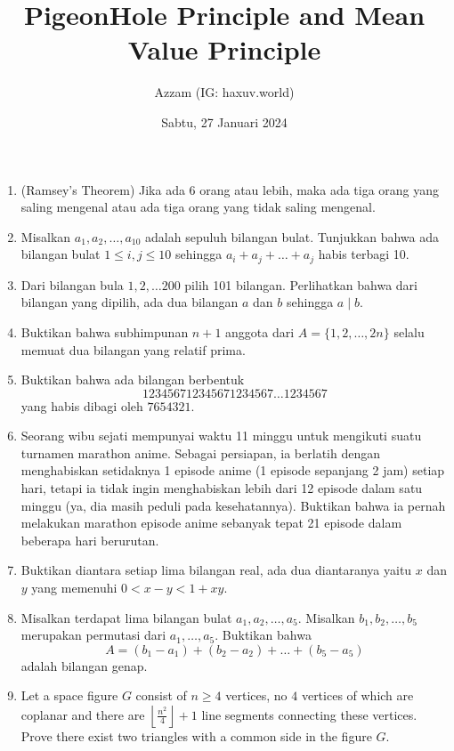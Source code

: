 \documentclass[11pt]{scrartcl}
\title{PigeonHole Principle and Mean Value Principle}
\author{Azzam (IG: haxuv.world)}
\date{Sabtu, 27 Januari 2024}
\begin{document}
\maketitle
\begin{enumerate}
    \item (Ramsey's Theorem) Jika ada 6 orang atau lebih, maka ada tiga orang yang saling mengenal atau ada tiga orang yang tidak saling mengenal.

    \item Misalkan $a_1, a_2, \dots, a_{10}$ adalah sepuluh bilangan bulat. Tunjukkan bahwa ada bilangan bulat $1 \le i,j \le 10$ sehingga $a_i+a_j+\dots+a_j$ habis terbagi 10.

    \item Dari bilangan bula $1,2,\dots 200$ pilih 101 bilangan. Perlihatkan bahwa dari bilangan yang dipilih, ada dua bilangan $a$ dan $b$ sehingga $a \mid b$.

    \item Buktikan bahwa subhimpunan $n+1$ anggota dari $A=\{1,2,\dots, 2n\}$ selalu memuat dua bilangan yang relatif prima.

    \item Buktikan bahwa ada bilangan berbentuk $$123456712345671234567\dots1234567$$
    yang habis dibagi oleh $7654321$.

    \item Seorang wibu sejati mempunyai waktu 11 minggu untuk mengikuti suatu turnamen marathon anime. Sebagai persiapan, ia berlatih dengan menghabiskan setidaknya 1 episode anime (1 episode sepanjang 2 jam) setiap hari, tetapi ia tidak ingin menghabiskan lebih dari 12 episode dalam satu minggu (ya, dia masih peduli pada kesehatannya). Buktikan bahwa ia pernah melakukan marathon episode anime sebanyak tepat 21 episode dalam beberapa hari berurutan.

    \item Buktikan diantara setiap lima bilangan real, ada dua diantaranya yaitu $x$ dan $y$ yang memenuhi $0 < x-y < 1+xy$.

    \item Misalkan terdapat lima bilangan bulat $a_1, a_2, \dots, a_5$. Misalkan $b_1,b_2,\dots,b_5$ merupakan permutasi dari $a_1,\dots,a_5$. Buktikan bahwa 
    $$A=(b_1-a_1)+(b_2-a_2)+\dots+(b_5-a_5)$$ adalah bilangan genap.

    \item Let a space figure $G$ consist of $n \ge 4$ vertices, no $4$ vertices of which are coplanar and there are $\left\lfloor \frac{n^2}{4} \right\rfloor + 1$ line segments connecting these vertices. Prove there exist two triangles with a common side in the figure $G$.
    

\end{enumerate}
\end{document}

